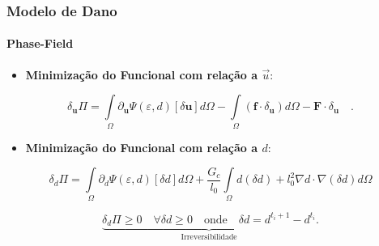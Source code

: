 \documentclass{beamer}
\begin{document}
\begin{frame}
    \frametitle{Modelo de Dano}
    \framesubtitle{Phase-Field}

        
    \begin{itemize}
        \item \textbf{Minimização do Funcional com relação a \(\vec{u}\)}: 
    \end{itemize}

    \begin{equation}
        \delta_{\boldsymbol{u}} \varPi = \int\limits_{\Omega} \partial_{\boldsymbol{u}} \Psi\left(\varepsilon, d\right) \left[\delta \boldsymbol{u}\right]d\Omega - \int\limits_{\Omega} \left(\boldsymbol{f} \cdot \delta_{\boldsymbol{u}}\right) d\Omega - \boldsymbol{F} \cdot \delta_{\boldsymbol{u}} \quad.
    \end{equation}


    \begin{itemize}
        \item \textbf{Minimização do Funcional com relação a \(d\)}: 
    \end{itemize}

    \begin{equation}
        \delta_d \varPi = \int\limits_{\Omega} \partial_d \Psi\left(\varepsilon, d\right) \left[\delta d\right]d\Omega + \frac{G_c}{l_0}\int\limits_{\Omega} d\left(\delta d\right)+l^2_0 \nabla d \cdot \nabla \left(\delta d\right) d\Omega
        \label{FunctionalVariation(d)}
    \end{equation}

    \begin{equation}
        \underbrace{\delta_d \varPi \geqslant 0 \quad \forall \delta d \geqslant 0 \quad \text{onde} \quad \delta d = d^{t_i+1} - d^{t_i}}_{\text{Irreversibilidade}} .
    \end{equation}
\end{frame}
\end{document}
